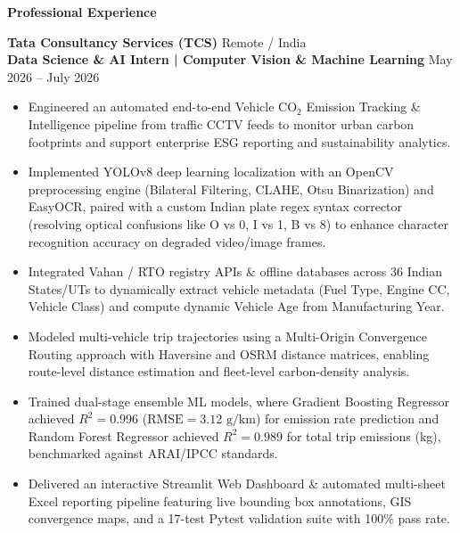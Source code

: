 \documentclass[10pt]{article}
\begin{document}
\vspace{10pt}

\begin{center}
    \textbf{Professional Experience}
\end{center}
\vspace{-4pt}

\textbf{Tata Consultancy Services (TCS)} \hfill Remote / India\\
\textbf{Data Science \& AI Intern | Computer Vision \& Machine Learning} \hfill May 2026 -- July 2026
\begin{itemize}[noitemsep, topsep=2pt, partopsep=0pt, parsep=1.5pt]
    \item Engineered an automated end-to-end Vehicle $\text{CO}_2$ Emission Tracking \& Intelligence pipeline from traffic CCTV feeds to monitor urban carbon footprints and support enterprise ESG reporting and sustainability analytics.
    \item Implemented YOLOv8 deep learning localization with an OpenCV preprocessing engine (Bilateral Filtering, CLAHE, Otsu Binarization) and EasyOCR, paired with a custom Indian plate regex syntax corrector (resolving optical confusions like O vs 0, I vs 1, B vs 8) to enhance character recognition accuracy on degraded video/image frames.
    \item Integrated Vahan / RTO registry APIs \& offline databases across 36 Indian States/UTs to dynamically extract vehicle metadata (Fuel Type, Engine CC, Vehicle Class) and compute dynamic Vehicle Age from Manufacturing Year.
    \item Modeled multi-vehicle trip trajectories using a Multi-Origin Convergence Routing approach with Haversine and OSRM distance matrices, enabling route-level distance estimation and fleet-level carbon-density analysis.
    \item Trained dual-stage ensemble ML models, where Gradient Boosting Regressor achieved $R^2 = 0.996$ ($\text{RMSE} = 3.12\text{ g/km}$) for emission rate prediction and Random Forest Regressor achieved $R^2 = 0.989$ for total trip emissions (kg), benchmarked against ARAI/IPCC standards.
    \item Delivered an interactive Streamlit Web Dashboard \& automated multi-sheet Excel reporting pipeline featuring live bounding box annotations, GIS convergence maps, and a 17-test Pytest validation suite with 100\% pass rate.
\end{itemize}
\end{document}

